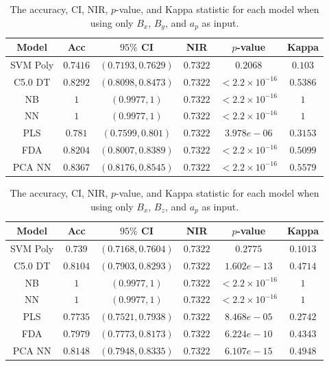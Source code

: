 \documentclass[sn-mathphys-num]{sn-jnl}%
\begin{document}
\begin{table}[!ht]
    \centering
    \caption{The accuracy, CI, NIR, $p$-value, and Kappa statistic for each model when using only $B_{x}$, $B_{y}$, and $a_{p}$ as input.}
	\label{tab:stats:reverse:xyap}
	\begin{tabular}{|c|c|c|c|c|c|}
		\hline
		Model & Acc & $95\%$ CI & NIR & $p$-value & Kappa \\ \hline
		SVM Poly & $0.7416$ & $(0.7193, 0.7629)$ & $0.7322$ & $0.2068$ & $0.103$ \\ \hline
		C5.0 DT & $0.8292$ & $(0.8098, 0.8473)$ & $0.7322$ & $< 2.2 \times {10}^{-16}$ & $0.5386$ \\ \hline
		NB & $1$ & $(0.9977, 1)$ & $0.7322$ & $< 2.2 \times {10}^{-16}$ & $1$ \\ \hline
		NN & $1$ & $(0.9977, 1)$ & $0.7322$ & $< 2.2 \times {10}^{-16}$ & $1$ \\ \hline
		PLS & $0.781$ & $(0.7599, 0.801)$ & $0.7322$ & $3.978e-06$ & $0.3153$ \\ \hline
		FDA & $0.8204$ & $(0.8007, 0.8389)$ & $0.7322$ & $< 2.2 \times {10}^{-16}$ & $0.5099$ \\ \hline
		PCA NN & $0.8367$ & $(0.8176, 0.8545)$ & $0.7322$ & $< 2.2 \times {10}^{-16}$ & $0.5579$ \\ \hline
	\end{tabular}
\end{table}

\begin{table}[!ht]
    \centering
    \caption{The accuracy, CI, NIR, $p$-value, and Kappa statistic for each model when using only $B_{x}$, $B_{z}$, and $a_{p}$ as input.}
	\label{tab:stats:reverse:xzap}
	\begin{tabular}{|c|c|c|c|c|c|}
		\hline
		Model & Acc & $95\%$ CI & NIR & $p$-value & Kappa \\ \hline
		SVM Poly & $0.739$ & $(0.7168, 0.7604)$ & $0.7322$ & $0.2775$ & $0.1013$ \\ \hline
		C5.0 DT & $0.8104$ & $(0.7903, 0.8293)$ & $0.7322$ & $1.602e-13$ & $0.4714$ \\ \hline
		NB & $1$ & $(0.9977, 1)$ & $0.7322$ & $< 2.2 \times {10}^{-16}$ & $1$ \\ \hline
		NN & $1$ & $(0.9977, 1)$ & $0.7322$ & $< 2.2 \times {10}^{-16}$ & $1$ \\ \hline
		PLS & $0.7735$ & $(0.7521, 0.7938)$ & $0.7322$ & $8.468e-05$ & $0.2742$ \\ \hline
		FDA & $0.7979$ & $(0.7773, 0.8173)$ & $0.7322$ & $6.224e-10$ & $0.4343$ \\ \hline
		PCA NN & $0.8148$ & $(0.7948, 0.8335)$ & $0.7322$ & $6.107e-15$ & $0.4948$ \\ \hline
	\end{tabular}
\end{table}
\end{document}
